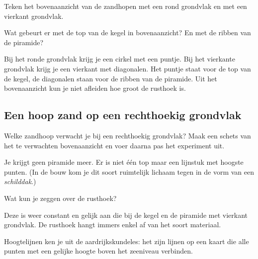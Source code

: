 \documentclass{ximera}
\begin{document}
\begin{exercise}
    Teken het bovenaanzicht van de zandhopen met een rond grondvlak en met een vierkant
    grondvlak.
    \begin{hint}
        Wat gebeurt er met de top van de kegel in bovenaanzicht? En met de ribben van de
        piramide?
    \end{hint}
    \begin{oplossing}
        Bij het ronde grondvlak krijg je een cirkel met een puntje. Bij het vierkante
        grondvlak krijg je een vierkant met diagonalen. Het puntje staat voor de top van
        de kegel, de diagonalen staan voor de ribben van de piramide. Uit het bovenaanzicht
        kun je niet afleiden hoe groot de rusthoek is.
    \end{oplossing}
\end{exercise}



\subsection*{Een hoop zand op een rechthoekig grondvlak}

\begin{exercise}
    Welke zandhoop verwacht je bij een rechthoekig grondvlak? Maak een schets van het te
    verwachten bovenaanzicht en voer daarna pas het experiment uit.
    \begin{oplossing}
        Je krijgt geen piramide meer. Er is niet \'e\'en top maar een lijnstuk met hoogste
        punten. (In de bouw kom je dit soort ruimtelijk lichaam tegen in de vorm van een
        \textit{schilddak}.)
    \end{oplossing}
\end{exercise}

\begin{exercise}
    Wat kun je zeggen over de rusthoek?
    \begin{oplossing}
        Deze is weer constant en gelijk aan die bij de kegel en de piramide met vierkant
        grondvlak. De rusthoek hangt immers enkel af van het soort materiaal.
    \end{oplossing}
\end{exercise}

Hoogtelijnen ken je uit de aardrijkskundeles: het zijn lijnen op een kaart die alle punten
met een gelijke hoogte boven het zeeniveau verbinden.
\end{document}
